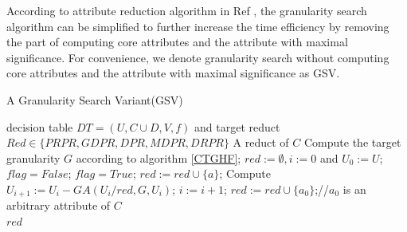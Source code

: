 \documentclass[review]{elsarticle}
\begin{document}
	According to attribute reduction algorithm in Ref \cite{li2014quick}, the granularity search algorithm can be simplified to further increase the time efficiency by removing the part of computing core attributes and the attribute with maximal significance. For convenience, we denote granularity search without computing core attributes and the attribute with maximal significance as GSV. 
	\begin{algorithm}[htb]
		\caption{A Granularity Search Variant(GSV)}
		\label{GSV}
		\begin{algorithmic}[1]
			\Require decision table $DT=(U, C \cup D,V,f)$ and target reduct $Red \in \{PRPR, GDPR, DPR, MDPR, DRPR\}$
			\Ensure A reduct of $C$
			\State Compute the target granularity $G$ according to algorithm \ref{CTGHF};
			\State $red:=\emptyset, i:=0$ and $U_0:=U$;
			\State $flag=False$;
			\State $flag=True$;
			\State $red:=red \cup \{a\}$;
			\State Compute $U_{i+1}:=U_i-GA(U_i/red,G,U_i)$;
			\State $i:=i+1$;
			\EndIf
			\EndFor
			\State $red:=red \cup \{a_0\}$;//$a_0$ is an arbitrary attribute of $C$
			\EndIf
			\EndWhile\\
			\Return $red$
		\end{algorithmic}
	\end{algorithm}
	
\end{document}
